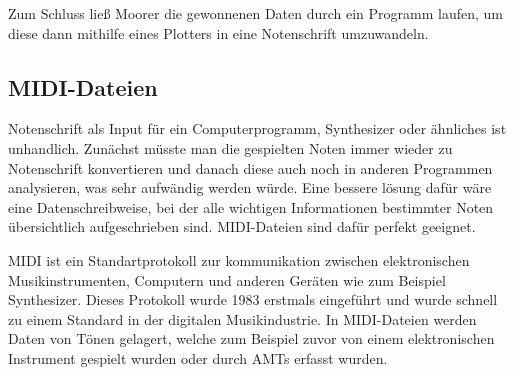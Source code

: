 Zum Schluss ließ Moorer die gewonnenen Daten durch ein Programm laufen, 
um diese dann mithilfe eines Plotters in eine Notenschrift umzuwandeln.

\subsection{MIDI-Dateien}
Notenschrift als Input für ein Computerprogramm, Synthesizer oder ähnliches ist unhandlich.
Zunächst müsste man die gespielten Noten immer wieder zu Notenschrift konvertieren
und danach diese auch noch in anderen Programmen analysieren, was sehr aufwändig werden würde.
Eine bessere lösung dafür wäre eine Datenschreibweise,
bei der alle wichtigen Informationen bestimmter Noten übersichtlich aufgeschrieben sind.
MIDI-Dateien sind dafür perfekt geeignet.

MIDI ist ein Standartprotokoll zur kommunikation zwischen
elektronischen Musikinstrumenten, Computern und anderen Geräten wie zum Beispiel Synthesizer.
Dieses Protokoll wurde 1983 erstmals eingeführt und wurde schnell zu einem Standard in der digitalen Musikindustrie.
\cite{smith1983midi}
In MIDI-Dateien werden Daten von Tönen gelagert,
welche zum Beispiel zuvor von einem elektronischen Instrument gespielt wurden oder durch AMTs erfasst wurden.

